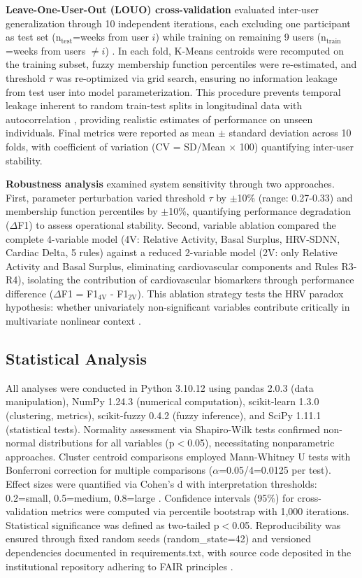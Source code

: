\textbf{Leave-One-User-Out (LOUO) cross-validation} evaluated inter-user generalization through 10 independent iterations, each excluding one participant as test set (n$_{\text{test}}$=weeks from user $i$) while training on remaining 9 users (n$_{\text{train}}$=weeks from users $\neq i$) \cite{Varoquaux2017,Poldrack2020}. In each fold, K-Means centroids were recomputed on the training subset, fuzzy membership function percentiles were re-estimated, and threshold $\tau$ was re-optimized via grid search, ensuring no information leakage from test user into model parameterization. This procedure prevents temporal leakage inherent to random train-test splits in longitudinal data with autocorrelation \cite{Rehman2024LOSO}, providing realistic estimates of performance on unseen individuals. Final metrics were reported as mean $\pm$ standard deviation across 10 folds, with coefficient of variation (CV = SD/Mean $\times$ 100) quantifying inter-user stability.

\textbf{Robustness analysis} examined system sensitivity through two approaches. First, parameter perturbation varied threshold $\tau$ by $\pm$10\% (range: 0.27-0.33) and membership function percentiles by $\pm$10\%, quantifying performance degradation ($\Delta$F1) to assess operational stability. Second, variable ablation compared the complete 4-variable model (4V: Relative Activity, Basal Surplus, HRV-SDNN, Cardiac Delta, 5 rules) against a reduced 2-variable model (2V: only Relative Activity and Basal Surplus, eliminating cardiovascular components and Rules R3-R4), isolating the contribution of cardiovascular biomarkers through performance difference ($\Delta$F1 = F1$_{\text{4V}}$ - F1$_{\text{2V}}$). This ablation strategy tests the HRV paradox hypothesis: whether univariately non-significant variables contribute critically in multivariate nonlinear context \cite{Godkin2025Context,Marino2024ARIC}.

\subsection{Statistical Analysis}
\label{subsec:statistics}

All analyses were conducted in Python 3.10.12 using pandas 2.0.3 (data manipulation), NumPy 1.24.3 (numerical computation), scikit-learn 1.3.0 (clustering, metrics), scikit-fuzzy 0.4.2 (fuzzy inference), and SciPy 1.11.1 (statistical tests). Normality assessment via Shapiro-Wilk tests \cite{Shapiro1965} confirmed non-normal distributions for all variables (p$<$0.05), necessitating nonparametric approaches. Cluster centroid comparisons employed Mann-Whitney U tests \cite{Mann1947} with Bonferroni correction for multiple comparisons ($\alpha$=0.05/4=0.0125 per test). Effect sizes were quantified via Cohen's d with interpretation thresholds: 0.2=small, 0.5=medium, 0.8=large \cite{Cohen1988}. Confidence intervals (95\%) for cross-validation metrics were computed via percentile bootstrap with 1,000 iterations. Statistical significance was defined as two-tailed p$<$0.05. Reproducibility was ensured through fixed random seeds (random\_state=42) and versioned dependencies documented in requirements.txt, with source code deposited in the institutional repository adhering to FAIR principles \cite{Wilkinson2016}.

